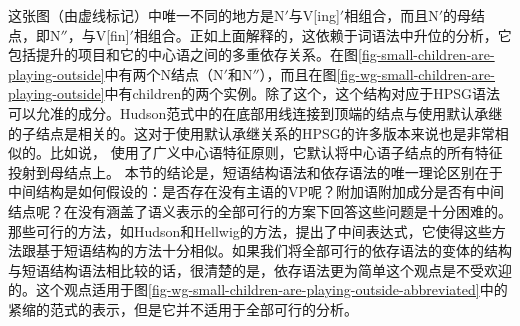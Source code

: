 这张图（由虚线标记）中唯一不同的地方是N$'$与V{[ing]}$'$相组合，而且N$'$的母结点，即N$''$，与V{[fin]}$'$相组合。正如上面解释的，这依赖于词语法中升位的分析，它包括提升的项目和它的中心语之间的多重依存关系。在图\ref{fig-small-children-are-playing-outside}中有两个N结点（N$'$和N$''$），而且在图\ref{fig-wg-small-children-are-playing-outside}中有children的两个实例。除了这个，这个结构对应于HPSG语法可以允准的成分。Hudson范式中的在底部用线连接到顶端的结点与使用默认承继的子结点是相关的。这对于使用默认承继关系的HPSG的许多版本来说也是非常相似的。比如说， \citet[]{GSag2000a-u}使用了广义中心语特征原则，它默认将中心语子结点的所有特征投射到母结点上。
%
本节的结论是，短语结构语法和依存语法的唯一理论区别在于中间结构是如何假设的：是否存在没有主语的VP呢？附加语附加成分是否有中间结点呢？在没有涵盖了语义表示的全部可行的方案下回答这些问题是十分困难的。那些可行的方法，如Hudson和Hellwig的方法，提出了中间表达式，它使得这些方法跟基于短语结构的方法十分相似。如果我们将全部可行的依存语法的变体的结构与短语结构语法相比较的话，很清楚的是，依存语法更为简单这个观点是不受欢迎的。这个观点适用于图\ref{fig-wg-small-children-are-playing-outside-abbreviated}中的紧缩的范式的表示，但是它并不适用于全部可行的分析。
